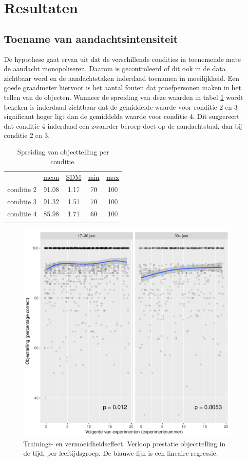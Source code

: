 \documentclass[a4paper,jou]{apa6}  %
\begin{document}
\section*{Resultaten}
\subsection{Toename van aandachtsintensiteit}
De hypothese gaat ervan uit dat de verschillende condities in toenemende mate de aandacht monopoliseren. Daarom is gecontroleerd of dit ook in de data zichtbaar werd en de aandachtstaken inderdaad toenamen in moeilijkheid. Een goede graadmeter hiervoor is het aantal fouten dat proefpersonen maken in het tellen van de objecten. Wanneer de spreiding van deze waarden in tabel \ref{tab:objecttelling} wordt bekeken is inderdaad zichtbaar dat de gemiddelde waarde voor conditie 2 en 3 significant hoger ligt dan de gemiddelde waarde voor conditie 4. Dit suggereert dat conditie 4 inderdaad een zwaarder beroep doet op de aandachtstaak dan bij conditie 2 en 3.
\begin{table}
\caption{\label{tab:objecttelling}Spreiding van objecttelling per conditie.}
\begin{tabular}{c c c c c}\hline
\centering
	 &  \underline{mean}  & \underline{SDM} & \underline{min} & \underline{max}\\
	conditie 2 & 91.08 & 1.17 & 70 & 100\\
	conditie 3 & 91.32 & 1.51 & 70 & 100\\
	conditie 4 & 85.98 & 1.71 & 60 & 100\\
	\hline\\
\end{tabular}
\end{table}
\begin{figure}
\centering
\includegraphics[width=1.0\linewidth]{training-grid.pdf}
\caption{\label{fig:objecttellingGrid}Trainings- en vermoeidheidseffect. Verloop prestatie objecttelling in de tijd, per leeftijdsgroep. De blauwe lijn is een lineaire regressie.}
\end{figure}
\end{document}
